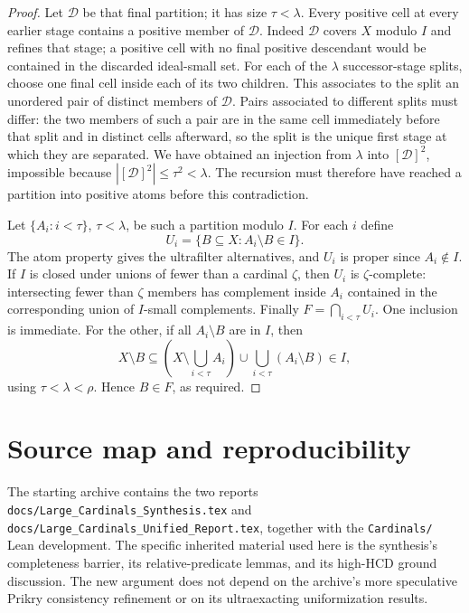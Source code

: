 \documentclass[11pt,letterpaper]{article}
\theoremstyle{definition}
\numberwithin{equation}{section}
\newcommand{\HCD}{\mathrm{HCD}}
\newcommand{\calD}{\mathcal D}
\begin{document}
\begin{proof}
Let $\calD$ be that final partition; it has size $\tau<\lambda$.
Every positive cell at every earlier stage contains a positive member
of $\calD$. Indeed $\calD$ covers $X$ modulo $I$ and refines that
stage; a positive cell with no final positive descendant would be
contained in the discarded ideal-small set.
For each of the $\lambda$ successor-stage splits, choose one final
cell inside each of its two children. This associates to the split an
unordered pair of distinct members of $\calD$.
Pairs associated to different splits must differ: the two members of
such a pair are in the same cell immediately before that split and
in distinct cells afterward, so the split is the unique first stage
at which they are separated. We have obtained an injection from
$\lambda$ into $[\calD]^2$, impossible because
$|[\calD]^2|\le\tau^2<\lambda$. The recursion must therefore have
reached a partition into positive atoms before this contradiction.

Let $\{A_i:i<\tau\}$, $\tau<\lambda$, be such a partition modulo
$I$. For each $i$ define
\[
U_i=\{B\subseteq X:A_i\setminus B\in I\}.
\]
The atom property gives the ultrafilter alternatives, and $U_i$ is
proper since $A_i\notin I$. If $I$ is closed under unions of fewer
than a cardinal $\zeta$, then $U_i$ is $\zeta$-complete: intersecting
fewer than $\zeta$ members has complement inside $A_i$ contained in
the corresponding union of $I$-small complements.
Finally $F=\bigcap_{i<\tau}U_i$. One inclusion is immediate. For the
other, if all $A_i\setminus B$ are in $I$, then
\[
X\setminus B\subseteq
\left(X\setminus\bigcup_{i<\tau}A_i\right)
\cup\bigcup_{i<\tau}(A_i\setminus B)\in I,
\]
using $\tau<\lambda<\rho$. Hence $B\in F$, as required.
\end{proof}

\section{Source map and reproducibility}\label{app:sources}

The starting archive contains the two reports
\nolinkurl{docs/Large_Cardinals_Synthesis.tex} and
\nolinkurl{docs/Large_Cardinals_Unified_Report.tex}, together with the
\nolinkurl{Cardinals/} Lean development. The specific inherited
material used here is the synthesis's completeness barrier, its
relative-predicate lemmas, and its high-$\HCD$ ground discussion.
The new argument does not depend on the archive's more speculative
Prikry consistency refinement or on its ultraexacting uniformization
results.
\end{document}
